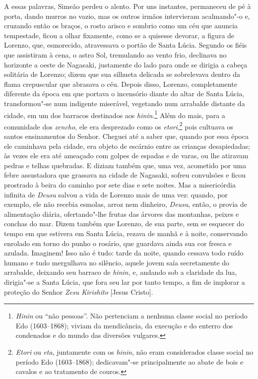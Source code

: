 A essas palavras, Simeão perdeu o alento. Por uns instantes, permaneceu
de pé à porta, dando murros no vazio, mas os outros irmãos intervieram
acalmando"-o e, cruzando então os braços, o rosto arisco e sombrio como
um céu que anuncia tempestade, ficou a olhar fixamente, como se a
quisesse devorar, a figura de Lorenzo, que, esmorecido, atravessava o
portão de Santa Lúcia. Segundo os fiéis que assistiram à cena, o astro
Sol, tremulando ao vento frio, declinava no horizonte a oeste de
Nagasaki, justamente do lado para onde se dirigia a cabeça solitária de
Lorenzo; dizem que sua silhueta delicada se sobrelevava dentro da flama
crepuscular que abrasava o céu. Depois disso, Lorenzo, completamente
diferente da época em que portava o incensório diante do altar de Santa
Lúcia, transformou"-se num indigente miserável, vegetando num arrabalde
distante da cidade, em um dos barracos destinados aos
\textit{hinin}.\footnote{\textit{Hinin} ou ``não pessoas''. Não pertenciam
a nenhuma classe social no período Edo (1603--1868); viviam da
mendicância, da execução e do enterro dos condenados e do mundo das
diversões vulgares.} Além do mais, para a comunidade dos
\textit{zencho}, ele era desprezado como os \textit{etori},\footnote{\textit{Etori} ou 
\textit{eta}, juntamente com os \textit{hinin}, não
eram considerados classe social no período Edo (1603--1868);
dedicavam"-se principalmente ao abate de bois e cavalos e ao tratamento
de couros.} pois cultuava os santos ensinamentos do Senhor. Cheguei
até a saber que, quando por essa época ele caminhava pela cidade, era
objeto de escárnio entre as crianças desapiedadas; às vezes ele era até
ameaçado com golpes de espadas e de varas, ou lhe atiravam pedras e
telhas quebradas. E diziam também que, uma vez, acometido por uma febre
assustadora que grassava na cidade de Nagasaki, sofreu convulsões e
ficou prostrado à beira do caminho por sete dias e sete noites. Mas a
misericórdia infinita de \textit{Deusu} salvou a vida de Lorenzo mais
de uma vez: quando, por exemplo, ele não recebia esmolas, arroz nem
dinheiro, \textit{Deusu}, então, o provia de alimentação diária,
ofertando"-lhe frutas das árvores das montanhas, peixes e conchas do
mar. Dizem também que Lorenzo, de sua parte, sem se esquecer do tempo
em que estivera em Santa Lúcia, rezava de manhã e à noite, conservando
enrolado em torno do punho o rosário, que guardava ainda sua cor fresca
e azulada. Imaginem! Isso não é tudo: tarde da noite, quando cessava
todo ruído humano e tudo mergulhava no silêncio, aquele jovem saía
secretamente do arrabalde, deixando seu barraco de \textit{hinin}, e,
andando sob a claridade da lua, dirigia"-se a Santa Lúcia, que fora seu
lar por tanto tempo, a fim de implorar a proteção do Senhor 
\textit{Zesu Kirishito} [Jesus Cristo].

